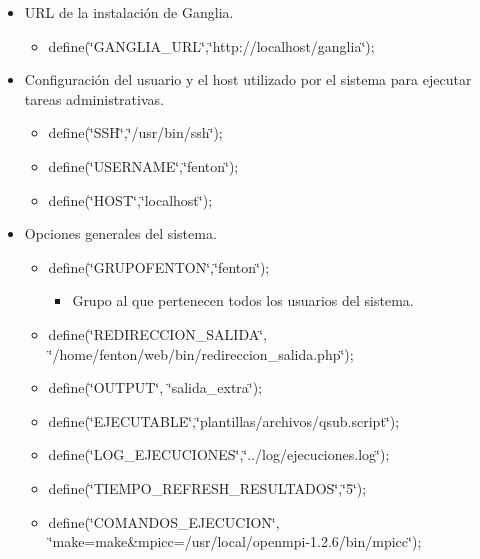 \documentclass[a4paper,10pt,spanish]{article}
\begin{document}
\begin{itemize}
\item URL de la instalaci\'{o}n de Ganglia.

\begin{itemize}
\item define(\char`\"{}GANGLIA\_URL\char`\"{},\char`\"{}http://localhost/ganglia\char`\"{});
\end{itemize}

\item Configuraci\'{o}n del usuario y el host utilizado por el sistema para ejecutar tareas administrativas.

\begin{itemize}
\item define(\char`\"{}SSH\char`\"{},\char`\"{}/usr/bin/ssh\char`\"{}); 
\item define(\char`\"{}USERNAME\char`\"{},\char`\"{}fenton\char`\"{}); 
\item define(\char`\"{}HOST\char`\"{},\char`\"{}localhost\char`\"{});
\end{itemize}

\item Opciones generales del sistema.

\begin{itemize}
\item define(\char`\"{}GRUPOFENTON\char`\"{},\char`\"{}fenton\char`\"{});

\begin{itemize}
\item Grupo al que pertenecen todos los usuarios del sistema.
\end{itemize}

\item define(\char`\"{}REDIRECCION\_SALIDA\char`\"{},\\
\char`\"{}/home/fenton/web/bin/redireccion\_salida.php\char`\"{});
\item define(\char`\"{}OUTPUT\char`\"{}, \char`\"{}salida\_extra\char`\"{});
\item define(\char`\"{}EJECUTABLE\char`\"{},\char`\"{}plantillas/archivos/qsub.script\char`\"{});
\item define(\char`\"{}LOG\_EJECUCIONES\char`\"{},\char`\"{}../log/ejecuciones.log\char`\"{});
\item define(\char`\"{}TIEMPO\_REFRESH\_RESULTADOS\char`\"{},\char`\"{}5\char`\"{});
\item define(\char`\"{}COMANDOS\_EJECUCION\char`\"{},\\
\char`\"{}make=make\&mpicc=/usr/local/openmpi-1.2.6/bin/mpicc\char`\"{});


\end{itemize}
\end{itemize}
\end{document}
